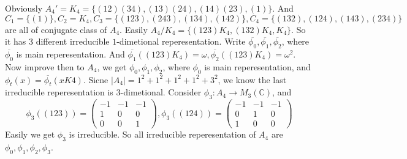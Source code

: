 \documentclass{ctexart}
\begin{document}
\begin{solution}
  Obviously \(A_4'=K_4=\{(1 2)(3 4),(1 3)(2 4),(1 4)(2 3),(1)\}\). 
  And \(C_1=\{(1)\}, C_2=K_4,C_3=\{(1 2 3),(243),(134),(142)\}, C_4=\{(132),(124),(143),(234)\}\) are all of conjugate class of \(A_4\). 
  Easily \(A_4/K_4=\{(123)K_4,(132)K_4,K_4\}\). So it has \(3\) different irreducible \(1\)-dimetional reperesentation. 
  Write \(\overline{\phi_0},\overline{\phi_1},\overline{\phi_2}\), where \(\overline{\phi_0}\) is main reperesentation. 
  And \(\overline{\phi_1}((123)K_4)=\omega,\overline{\phi_2}((123)K_4)=\omega^2\). 
  Now improve then to \(A_4\), we get \(\phi_0,\phi_1,\phi_2\), where \(\phi_0\) is main reperesentation, and 
  \(\phi_t(x)=\overline{\phi_t}(xK4)\). 
  Sicne \(|A_4|=1^2+1^2+1^2+1^2+3^2\), we know the last irreducible reperesentation is \(3\)-dimetional. 
  Consider \(\phi_3:A_4 \to M_3(\mathbb{C})\), and 
  \[
    \phi_3((123))=\begin{pmatrix}
      -1 & -1 & -1 \\
      1 & 0 & 0 \\
      0 & 0 & 1
    \end{pmatrix}, \phi_3((124))=\begin{pmatrix}
      -1 & -1 & -1 \\
      0 & 1 & 0 \\
      1 & 0 & 0
    \end{pmatrix}
  \]
  Easily we get \(\phi_3\) is irreducible. 
  So all irreducible reperesentation of \(A_4\) are \(\phi_0,\phi_1,\phi_2,\phi_3\). 
\end{solution}
\end{document}
